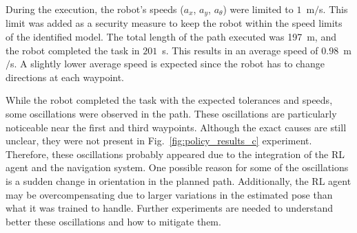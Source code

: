 During the execution, the robot's speeds ($a_x$, $a_y$, $a_{\theta}$) were limited to $1$~m$/$s. This limit was added as a security measure to keep the robot within the speed limits of the identified model. The total length of the path executed was 197~m, and the robot completed the task in $201$~s. This results in an average speed of $0.98$~m$/$s. A slightly lower average speed is expected since the robot has to change directions at each waypoint.

While the robot completed the task with the expected tolerances and speeds, some oscillations were observed in the path. These oscillations are particularly noticeable near the first and third waypoints. Although the exact causes are still unclear, they were not present in Fig.~\ref{fig:policy_results_c} experiment. Therefore, these oscillations probably appeared due to the integration of the RL agent and the navigation system. One possible reason for some of the oscillations is a sudden change in orientation in the planned path. Additionally, the RL agent may be overcompensating due to larger variations in the estimated pose than what it was trained to handle. Further experiments are needed to understand better these oscillations and how to mitigate them.